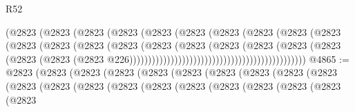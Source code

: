 \begin{lexlean}{R52}
\begin{coremodule}
{{{{{{{{{{{{{{{{{{{{{{{{{{{{{{{{{{{{{{{{{{{{{{{{{{{{{{{{{{{{{{{{{{{{{{{{{{{{{{{{{{{{{{{{{{{{{{{{{{{{{{{{{{{{{{{{{{{{{{{{{{{{{{{{{{{{{{{{{{{{{{{{{{{{{{{{{{{{{{{{{{{{{{{{{{{{{{{{{{{{{{{{{{{{{{{{{{{{{{                                                    (@2823
                                                      (@2823
                                                        (@2823
                                                          (@2823
                                                            (@2823
                                                              (@2823
                                                                (@2823
                                                                  (@2823
                                                                    (@2823
                                                                      (@2823
                                                                        (@2823
                                                                          (@2823
                                                                            (@2823
                                                                              (@2823
                                                                                (@2823
                                                                                  (@2823
                                                                                    (@2823
                                                                                      (@2823
                                                                                        (@2823
                                                                                          (@2823
                                                                                            (@2823
                                                                                              (@2823
                                                                                                (@2823
                                                                                                  @226)))))))))))))))))))))))))))))))))))))))))))))))
@4865 := @2823
    (@2823
      (@2823
        (@2823
          (@2823
            (@2823
              (@2823
                (@2823
                  (@2823
                    (@2823
                      (@2823
                        (@2823
                          (@2823
                            (@2823
                              (@2823
                                (@2823
                                  (@2823
                                    (@2823
                                      (@2823
                                        (@2823
                                          (@2823
}}}}}}}}}}}}}}}}}}}}}}}}}}}}}}}}}}}}}}}}}}}}}}}}}}}}}}}}}}}}}}}}}}}}}}}}}}}}}}}}}}}}}}}}}}}}}}}}}}}}}}}}}}}}}}}}}}}}}}}}}}}}}}}}}}}}}}}}}}}}}}}}}}}}}}}}}}}}}}}}}}}}}}}}}}}}}}}}}}}}}}}}}}}}}}}}}}}}}}
\end{coremodule}
\end{lexlean}

